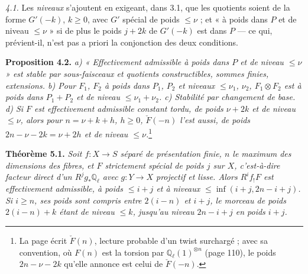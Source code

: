 \documentclass[11pt,a4paper]{article}
\begin{document}
\emph{4.1.} Les \emph{niveaux} s'ajoutent en exigeant, dans 3.1, que les quotients
soient de la forme $G'(-k)$, $k \geqslant 0$, avec $G'$ spécial de poids $\leqslant
\nu$ ; et « à poids dans $P$ et de niveau $\leqslant \nu$ » si de plus le poids
$j + 2k$ de $G'(-k)$ est dans $P$ --- ce qui, prévient-il, n'est pas a priori la
conjonction des deux conditions.

\textbf{Proposition 4.2.} \emph{a) « Effectivement admissible à poids dans $P$ et
de niveau $\leqslant \nu$ » est stable par sous-faisceaux et quotients
constructibles, sommes finies, extensions. b) Pour $F_{1}$, $F_{2}$ à poids dans
$P_{1}$, $P_{2}$ et niveaux $\leqslant \nu_{1}$, $\nu_{2}$, $F_{1} \otimes F_{2}$ est
à poids dans $P_{1} + P_{2}$ et de niveau $\leqslant \nu_{1} + \nu_{2}$. c) Stabilité
par changement de base. d) Si $F$ est effectivement admissible constant tordu, de
poids $\nu + 2k$ et de niveau $\leqslant \nu$, alors pour $n = \nu + k + h$, $h
\geqslant 0$, $\check{F}(-n)$ l'est aussi, de poids $2n - \nu - 2k = \nu + 2h$ et de
niveau $\leqslant \nu$.}\footnote{La page écrit $\check{F}(n)$, lecture probable
d'un twist surchargé ; avec sa convention, où $F(n)$ est la torsion par
$\mathbb{Q}_{\ell}(1)^{\otimes n}$ (page 110), le poids $2n - \nu - 2k$ qu'elle
annonce est celui de $\check{F}(-n)$.}

\textbf{Théorème 5.1.} \emph{Soit $f \colon X \to S$ séparé de présentation finie,
$n$ le maximum des dimensions des fibres, et $F$ strictement spécial de poids $j$
sur $X$, c'est-à-dire facteur direct d'un $R^{j}g_{*}\mathbb{Q}_{\ell}$ avec $g
\colon Y \to X$ projectif et lisse. Alors $R^{i}f_{!}F$ est effectivement
admissible, à poids $\leqslant i+j$ et à niveaux $\leqslant \inf(i+j, 2n-i+j)$. Si
$i \geqslant n$, ses poids sont compris entre $2(i-n)$ et $i+j$, le morceau de poids
$2(i-n) + k$ étant de niveau $\leqslant k$, jusqu'au niveau $2n-i+j$ en poids $i+j$.}
\end{document}
